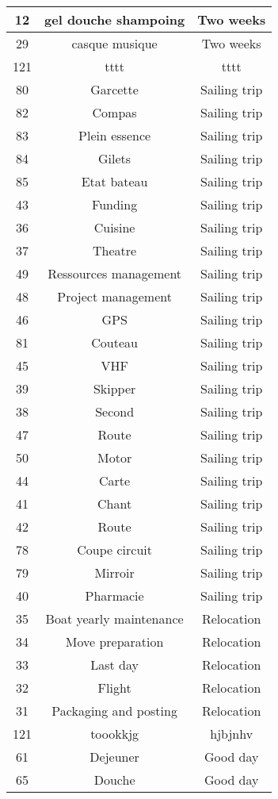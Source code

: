 \begin{longtable}{|c|c|c|}
\hline
12 & gel douche shampoing & Two weeks\\
\hline
29 & casque musique & Two weeks\\
\hline
121 & tttt & tttt\\
\hline
80 & Garcette & Sailing trip\\
\hline
82 & Compas & Sailing trip\\
\hline
83 & Plein essence & Sailing trip\\
\hline
84 & Gilets & Sailing trip\\
\hline
85 & Etat bateau & Sailing trip\\
\hline
43 & Funding & Sailing trip\\
\hline
36 & Cuisine & Sailing trip\\
\hline
37 & Theatre & Sailing trip\\
\hline
49 & Ressources management & Sailing trip\\
\hline
48 & Project management & Sailing trip\\
\hline
46 & GPS & Sailing trip\\
\hline
81 & Couteau  & Sailing trip\\
\hline
45 & VHF & Sailing trip\\
\hline
39 & Skipper & Sailing trip\\
\hline
38 & Second & Sailing trip\\
\hline
47 & Route & Sailing trip\\
\hline
50 & Motor & Sailing trip\\
\hline
44 & Carte & Sailing trip\\
\hline
41 & Chant & Sailing trip\\
\hline
42 & Route & Sailing trip\\
\hline
78 & Coupe circuit & Sailing trip\\
\hline
79 & Mirroir & Sailing trip\\
\hline
40 & Pharmacie & Sailing trip\\
\hline
35 & Boat yearly maintenance & Relocation\\
\hline
34 & Move preparation & Relocation\\
\hline
33 & Last day & Relocation\\
\hline
32 & Flight & Relocation\\
\hline
31 & Packaging and posting & Relocation\\
\hline
121 & toookkjg & hjbjnhv\\
\hline
61 & Dejeuner & Good day\\
\hline
65 & Douche & Good day\\

\end{longtable}
